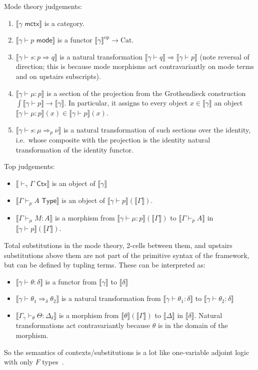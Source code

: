 \documentclass[10pt]{article}
\theoremstyle{definition}
\newcommand{\yields}{\vdash}
\newcommand{\tcell}{\Rightarrow}
\newcommand{\CTX}{\,\,\mathsf{Ctx}}
\newcommand{\ctx}{\,\,\mathsf{mctx}}
\newcommand{\TYPE}{\,\,\mathsf{Type}}
\newcommand{\type}{\,\,\mathsf{mode}}
\newcommand\TypeTwo[4]{\ensuremath{#1 \vdash #2 :  #3 \tcell #4}}
\newcommand\TermTwoT[5]{\ensuremath{#1 \vdash {#2} : #3 \tcell_{#5} #4}}
\newcommand\mm[1]{\llbracket #1 \rrbracket}
\newcommand\op{^{\mathrm{op}}}
\newcommand\Cat{\mathrm{Cat}}
\begin{document}
Mode theory judgements:
\begin{enumerate}
\item $\mm{\gamma \ctx}$ is a category.
\item $\mm{\gamma \yields p \type}$ is a functor $\mm{\gamma}\op \to \Cat$.
\item $\mm{\TypeTwo{\gamma}{s}{p}{q}}$ is a natural transformation $\mm{\gamma \yields q} \Rightarrow \mm{\gamma \yields p}$ (note reversal of direction; this is because mode morphisms act contravariantly on mode terms and on upstairs subscripts).
\item $\mm{\gamma \yields \mu : p}$ is a section of the projection from the Grothendieck construction $\int\mm{\gamma\yields p} \to \mm{\gamma}$.
  In particular, it assigns to every object $x\in \mm{\gamma}$ an object $\mm{\gamma \yields \mu : p}(x)\in \mm{\gamma\yields p}(x)$.
\item $\mm{\TermTwoT{\gamma}{s}{\mu}{\nu}{p}}$ is a natural transformation of such sections over the identity, i.e.\ whose composite with the projection is the identity natural transformation of the identity functor.
\end{enumerate}

Top judgements: 
\begin{itemize}
\item $\mm{\yields_\gamma \Gamma \CTX}$ is an object of $\mm{\gamma}$
\item $\mm{\Gamma \yields_p A \TYPE}$ is an object of $\mm{\gamma \yields p}(\mm{\Gamma})$.
\item $\mm{\Gamma \yields_\mu M : A}$ is a morphism from $\mm{\gamma \yields \mu : p}(\mm{\Gamma})$ to $\mm{\Gamma \yields_p A}$ in $\mm{\gamma \yields p}(\mm{\Gamma})$.
\end{itemize}

Total substitutions in the mode theory, 2-cells between them, and
upstairs substitutions above them are not part of the primitive syntax
of the framework, but can be defined by tupling terms.
These can be interpreted as: 
\begin{itemize}
\item $\mm{\gamma \yields \theta : \delta}$ is a functor from $\mm{\gamma}$ to $\mm{\delta}$
\item $\mm{\gamma \yields \theta_1 \tcell_\delta \theta_2}$ is a natural
  transformation from $\mm{\gamma \yields \theta_1 : \delta}$ to
  $\mm{\gamma \yields \theta_2 : \delta}$
\item $\mm{\Gamma_{\gamma} \yields_\theta \Theta : \Delta_\delta}$ is a
  morphism from $\mm{\theta}(\mm{\Gamma})$ to $\mm{\Delta}$ in
  $\mm{\delta}$.
  Natural transformations act contravariantly because $\theta$ is in the
  domain of the morphism.  
  \end{itemize}
So the semantics of contexts/substitutions is a lot like 
one-variable adjoint logic with only $F$ types~\cite{ls15adjoint}.  
\end{document}
